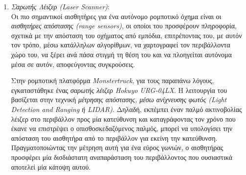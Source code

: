 \bigskip
\begin{enumerate}
\item \textit{Σαρωτής Λέιζερ (Laser Scanner)}:\\
Οι πιο σημαντικοί αισθητήρες για ένα αυτόνομο ρομποτικό όχημα είναι οι \textit{αισθητήρες απόστασης (range sensors)}, οι οποίοι του προσφέρουν πληροφορία, σχετικά με την απόσταση του οχήματος από εμπόδια, επιτρέποντας του, με αυτόν τον τρόπο, μέσω κατάλληλων αλγορίθμων, να χαρτογραφεί τον περιβάλλοντα χώρο του, να ξέρει ανά πάσα στιγμή τη θέση του και να πλοηγείται αυτόνομα μέσα σε αυτόν, αποφεύγοντας συγκρούσεις. 

Στην ρομποτική πλατφόρμα \textit{Monstertruck}, για τους παραπάνω λόγους, εγκαταστάθηκε ένας \textit{σαρωτής λέιζερ Hokuyo URG-04LX}. Η λειτουργία του βασίζεται στην τεχνική \textit{μέτρησης απόστασης, μέσω ανίχνευσης φωτός (Light Detection and Ranging ή LIDAR)}. Δηλαδή, εκπέμπει έναν παλμό ακτινοβολίας λέιζερ στο περιβάλλον προς μία κατεύθυνση και καταγράφοντας τον χρόνο που έκανε να επιστρέψει ο οπισθοσκεδαζόμενος παλμός, μπορεί να υπολογίσει την απόσταση του αισθητήρα από το περιβάλλον για εκείνη την κατεύθυνση. Πραγματοποιώντας την μέτρηση αυτή για ένα εύρος γωνιών, ο αισθητήρας προσφέρει μία δισδιάστατη αναπαράσταση του περιβάλλοντος που ουσιαστικά αποτελεί μία κάτοψη αυτού.


\end{enumerate}
